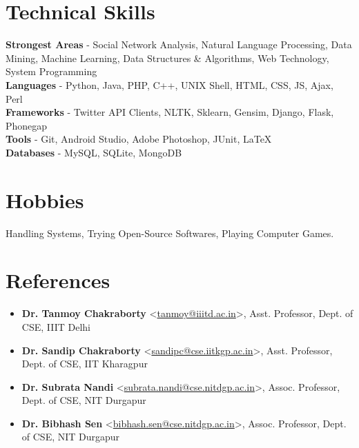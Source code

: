 \documentclass[margin, centered]{res}
\begin{document}
\begin{resume}

\section{Technical \hspace{2mm} Skills}
\textbf{Strongest Areas} - Social Network Analysis, Natural Language Processing, Data Mining, Machine Learning, Data Structures \& Algorithms, Web Technology, System Programming \\
\textbf{Languages} - Python, Java, PHP, C++, UNIX Shell, HTML, CSS, JS, Ajax, Perl \\
\textbf{Frameworks} - Twitter API Clients, NLTK, Sklearn, Gensim, Django, Flask, Phonegap \\
\textbf{Tools} - Git, Android Studio, Adobe Photoshop, JUnit, \LaTeX \\
\textbf{Databases} - MySQL, SQLite, MongoDB \\


\section{Hobbies}
Handling Systems, Trying Open-Source Softwares, Playing Computer Games.

\section{References}
\begin{itemize}[leftmargin=*]
\item[] \textbf{Dr. Tanmoy Chakraborty} \textless \href{mailto:tanmoy@iiitd.ac.in}{tanmoy@iiitd.ac.in}\textgreater, Asst. Professor, Dept. of CSE, IIIT Delhi
\item[] \textbf{Dr. Sandip Chakraborty} \textless \href{mailto:sandipc@cse.iitkgp.ac.in}{sandipc@cse.iitkgp.ac.in}\textgreater, Asst. Professor, Dept. of CSE, IIT Kharagpur
\item[] \textbf{Dr. Subrata Nandi} \textless \href{mailto:subrata.nandi@cse.nitdgp.ac.in}{subrata.nandi@cse.nitdgp.ac.in}\textgreater, Assoc. Professor, Dept. of CSE, NIT Durgapur
\item[] \textbf{Dr. Bibhash Sen} \textless \href{mailto:bibhash.sen@cse.nitdgp.ac.in}{bibhash.sen@cse.nitdgp.ac.in}\textgreater, Assoc. Professor, Dept. of CSE, NIT Durgapur

\end{itemize}


\end{resume}
\end{document}
